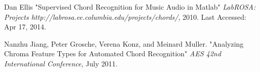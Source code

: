 \documentclass{article}
\begin{document}
\begin{thebibliography}{citations}
Dan Ellis
"Supervised Chord Recognition for Music Audio in Matlab"
{\it LabROSA: Projects http://labrosa.ee.columbia.edu/projects/chords/},
2010. Last Accessed: Apr 17, 2014. 

Nanzhu Jiang, Peter Grosche, Verena Konz, and Meinard Muller.
"Analyzing Chroma Feature Types for Automated Chord Recognition"
{\it AES 42nd International Conference},
July 2011. 

\end{thebibliography}


\end{document}
